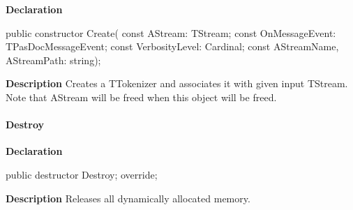 \documentclass{report}
\newif\ifpdf
\begin{document}
\label{PasDoc_Tokenizer.TTokenizer-Create}
\begin{list}{}{
\setlength{\itemindent}{0cm}
\setlength{\listparindent}{0cm}
\setlength{\leftmargin}{\evensidemargin}
\addtolength{\leftmargin}{\tmplength}
\settowidth{\labelsep}{X}
\addtolength{\leftmargin}{\labelsep}
\setlength{\labelwidth}{\tmplength}
}
\item[\textbf{Declaration}\hfill]
\ifpdf
\begin{flushleft}
\fi
\begin{ttfamily}
public constructor Create( const AStream: TStream; const OnMessageEvent: TPasDocMessageEvent; const VerbosityLevel: Cardinal; const AStreamName, AStreamPath: string);\end{ttfamily}

\ifpdf
\end{flushleft}
\fi

\par
\item[\textbf{Description}]
Creates a TTokenizer and associates it with given input TStream. Note that AStream will be freed when this object will be freed.

\end{list}
\paragraph*{Destroy}\hspace*{\fill}

\label{PasDoc_Tokenizer.TTokenizer-Destroy}
\begin{list}{}{
\setlength{\itemindent}{0cm}
\setlength{\listparindent}{0cm}
\setlength{\leftmargin}{\evensidemargin}
\addtolength{\leftmargin}{\tmplength}
\settowidth{\labelsep}{X}
\addtolength{\leftmargin}{\labelsep}
\setlength{\labelwidth}{\tmplength}
}
\item[\textbf{Declaration}\hfill]
\ifpdf
\begin{flushleft}
\fi
\begin{ttfamily}
public destructor Destroy; override;\end{ttfamily}

\ifpdf
\end{flushleft}
\fi

\par
\item[\textbf{Description}]
Releases all dynamically allocated memory.

\end{list}
\end{document}
